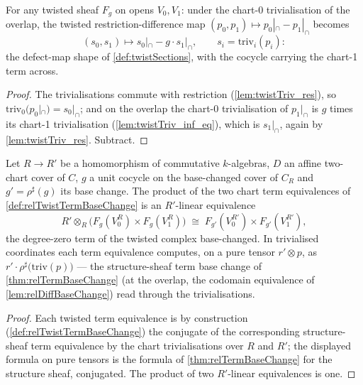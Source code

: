 \begin{lemma}
  \label{lem:twistTriv_pairDiff}
  \leanok
  For any twisted sheaf \(F_g\) on opens \(V_0, V_1\): under the chart-0
  trivialisation of the overlap, the twisted restriction-difference map
  \((p_0, p_1) \mapsto p_0|_{\cap} - p_1|_{\cap}\) becomes
  \[
    (s_0, s_1) \longmapsto s_0|_{\cap} - g \cdot s_1|_{\cap},
    \qquad s_i = \mathrm{triv}_i(p_i) :
  \]
  the defect-map shape of \ref{def:twistSections}, with the cocycle carrying the
  chart-1 term across.
\end{lemma}
\begin{proof}
  \leanok
  The trivialisations commute with restriction (\ref{lem:twistTriv_res}), so
  \(\mathrm{triv}_0(p_0|_{\cap}) = s_0|_{\cap}\); and on the overlap the chart-0
  trivialisation of \(p_1|_{\cap}\) is \(g\) times its chart-1 trivialisation
  (\ref{lem:twistTriv_inf_eq}), which is \(s_1|_{\cap}\), again by
  \ref{lem:twistTriv_res}. Subtract.
\end{proof}

\begin{definition}
  \label{def:relTwistDomBaseChange}
  \leanok
  Let \(R \to R'\) be a homomorphism of commutative \(k\)-algebras, \(D\) an affine
  two-chart cover of \(C\), \(g\) a unit cocycle on the base-changed cover of \(C_R\)
  and \(g' = \rho^{\sharp}(g)\) its base change. The product of the two chart term
  equivalences of \ref{def:relTwistTermBaseChange} is an \(R'\)-linear equivalence
  \[
    R' \otimes_R \bigl(F_g(V_0^R) \times F_g(V_1^R)\bigr) \;\cong\;
      F_{g'}(V_0^{R'}) \times F_{g'}(V_1^{R'}),
  \]
  the degree-zero term of the twisted complex base-changed. In trivialised coordinates
  each term equivalence computes, on a pure tensor \(r' \otimes p\), as
  \(r' \cdot \rho^{\sharp}\bigl(\mathrm{triv}(p)\bigr)\) --- the structure-sheaf term
  base change of \ref{thm:relTermBaseChange} (at the overlap, the codomain equivalence
  of \ref{lem:relDiffBaseChange}) read through the trivialisations.
\end{definition}
\begin{proof}
  \leanok
  Each twisted term equivalence is by construction
  (\ref{def:relTwistTermBaseChange}) the conjugate of the corresponding
  structure-sheaf term equivalence by the chart trivialisations over \(R\) and
  \(R'\); the displayed formula on pure tensors is the formula of
  \ref{thm:relTermBaseChange} for the structure sheaf, conjugated. The product of two
  \(R'\)-linear equivalences is one.
\end{proof}

